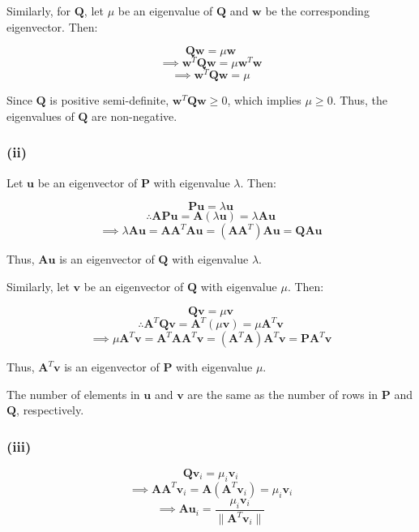 \documentclass{article}
\begin{document}
Similarly, for \( \mathbf{Q} \), let \( \mu \) be an eigenvalue of \( \mathbf{Q} \) and \( \mathbf{w} \) be the corresponding eigenvector. Then:

$$\mathbf{Q}\mathbf{w} = \mu \mathbf{w}$$
$$\implies \mathbf{w}^T\mathbf{Q}\mathbf{w} = \mu \mathbf{w}^T\mathbf{w}$$
$$\implies \mathbf{w}^T\mathbf{Q}\mathbf{w} = \mu$$

Since \( \mathbf{Q} \) is positive semi-definite, \( \mathbf{w}^T\mathbf{Q}\mathbf{w} \geq 0 \), which implies \( \mu \geq 0 \). Thus, the eigenvalues of \( \mathbf{Q} \) are non-negative.

\subsubsection*{(ii)}

Let \( \mathbf{u} \) be an eigenvector of \( \mathbf{P} \) with eigenvalue \( \lambda \). Then:

$$\mathbf{P}\mathbf{u} = \lambda \mathbf{u}$$
$$\therefore \mathbf{A}\mathbf{P}\mathbf{u} = \mathbf{A}(\lambda \mathbf{u}) = \lambda \mathbf{A}\mathbf{u}$$
$$\implies \lambda \mathbf{A}\mathbf{u} = \mathbf{A}\mathbf{A}^T\mathbf{A}\mathbf{u} = (\mathbf{A}\mathbf{A}^T)\mathbf{A}\mathbf{u} = \mathbf{Q}\mathbf{A}\mathbf{u} $$

Thus, \( \mathbf{A}\mathbf{u} \) is an eigenvector of \( \mathbf{Q} \) with eigenvalue \( \lambda \).

Similarly, let \( \mathbf{v} \) be an eigenvector of \( \mathbf{Q} \) with eigenvalue \( \mu \). Then:

$$\mathbf{Q}\mathbf{v} = \mu \mathbf{v}$$
$$\therefore \mathbf{A}^T\mathbf{Q}\mathbf{v} = \mathbf{A}^T(\mu \mathbf{v}) = \mu \mathbf{A}^T\mathbf{v}$$
$$\implies \mu \mathbf{A}^T\mathbf{v} = \mathbf{A}^T\mathbf{A}\mathbf{A}^T\mathbf{v} = (\mathbf{A}^T\mathbf{A})\mathbf{A}^T\mathbf{v} = \mathbf{P}\mathbf{A}^T\mathbf{v} $$

Thus, \( \mathbf{A}^T\mathbf{v} \) is an eigenvector of \( \mathbf{P} \) with eigenvalue \( \mu \).

The number of elements in \( \mathbf{u} \) and \( \mathbf{v} \) are the same as the number of rows in \( \mathbf{P} \) and \( \mathbf{Q} \), respectively.

\subsubsection*{(iii)}

$$\mathbf{Q}\mathbf{v}_i = \mu_i \mathbf{v}_i$$
$$\implies \mathbf{A}\mathbf{A}^T\mathbf{v}_i = \mathbf{A}(\mathbf{A}^T\mathbf{v}_i) = \mu_i \mathbf{v}_i$$
$$\implies \mathbf{A}\mathbf{u}_i = \frac{\mu_i \mathbf{v}_i}{\|\mathbf{A}^T\mathbf{v}_i\|}$$
\end{document}
